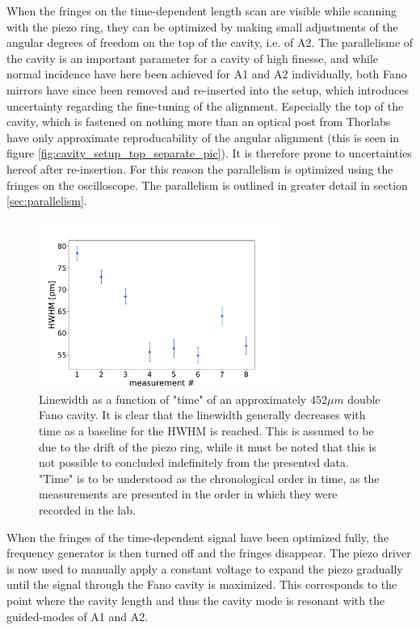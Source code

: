 When the fringes on the time-dependent length scan are visible while scanning with the piezo ring, they can be optimized by making small adjustments of the angular degrees of freedom on the top of the cavity, i.e. of A2. The parallelisme of the cavity is an important parameter for a cavity of high finesse, and while normal incidence have here been achieved for A1 and A2 individually, both Fano mirrors have since been removed and re-inserted into the setup, which introduces uncertainty regarding the fine-tuning of the alignment. Especially the top of the cavity, which is fastened on nothing more than an optical post from Thorlabs have only approximate reproducability of the angular alignment (this is seen in figure \ref{fig:cavity_setup_top_separate_pic}). It is therefore prone to uncertainties hereof after re-insertion. For this reason the parallelism is optimized using the fringes on the oscilloscope. The parallelism is outlined in greater detail in section \ref{sec:parallelism}.

\begin{figure}[h!]
    \centering
    \includegraphics[width=0.7\textwidth]{figures/HWHM_vs_time_20250266_452um.pdf}
    \caption{Linewidth as a function of "time" of an approximately $452 \mu m$ double Fano cavity. It is clear that the linewidth generally decreases with time as a baseline for the HWHM is reached. This is assumed to be due to the drift of the piezo ring, while it must be noted that this is not possible to concluded indefinitely from the presented data. "Time" is to be understood as the chronological order in time, as the measurements are presented in the order in which they were recorded in the lab.}
    \label{fig:HWHM_vs_time}
\end{figure}

When the fringes of the time-dependent signal have been optimized fully, the frequency generator is then turned off and the fringes disappear. The piezo driver is now used to manually apply a constant voltage to expand the piezo gradually until the signal through the Fano cavity is maximized. This corresponds to the point where the cavity length and thus the cavity mode is resonant with the guided-modes of A1 and A2.


